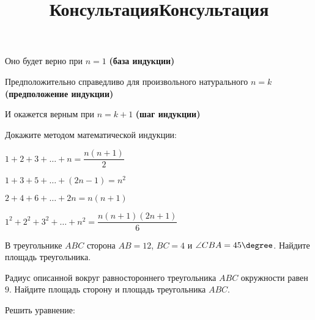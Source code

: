 \begin{enumcols}[itemcolumns=1]
	\item Оно будет верно при \( n=1 \) \textbf{(база индукции)}
	\item Предположительно справедливо для произвольного натурального \( n=k \) \textbf{(предположение индукции)}
	\item И окажется верным при \( n=k+1 \) \textbf{(шаг индукции)}
\end{enumcols}
\begin{listofex}
	\item Докажите методом математической индукции:
	\begin{enumcols}[itemcolumns=2]
		\item \( 1+2+3+\dots+n=\dfrac{n(n+1)}{2} \)
		\item \( 1+3+5+\dots+(2n-1)=n^2 \)
		\item \( 2+4+6+\dots+2n=n(n+1) \)
		\item \( 1^2+2^2+3^2+\dots+n^2=\dfrac{n(n+1)(2n+1)}{6} \)
	\end{enumcols}
	\item В треугольнике \( ABC \) сторона \( AB=12 \), \( BC=4 \) и \( \angle CBA=45\degree \). Найдите площадь треугольника.
	\item Радиус описанной вокруг равностороннего треугольника \( ABC \) окружности равен \( 9 \). Найдите площадь сторону и площадь треугольника \( ABC \).
\end{listofex}
\newpage
\title{Консультация}
\begin{listofex}
	\item Решить уравнение:
	\begin{enumcols}[itemcolumns=1]
		\item {}
		\item {}
		\item {}
		\item {}
		\item {}
		\item {}
		\item {}
	\end{enumcols}
\end{listofex}
\newpage
\title{Консультация}
